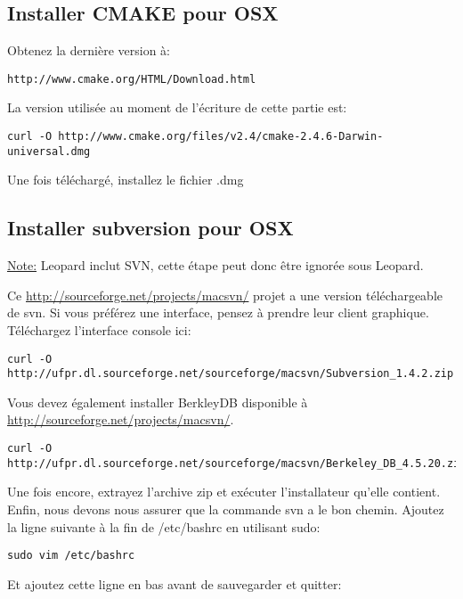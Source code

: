 \subsection{Installer CMAKE pour OSX}
Obtenez la derni\`ere version \`a:

\begin{verbatim}
http://www.cmake.org/HTML/Download.html 
\end{verbatim}

La version utilis\'ee au moment de l'\'ecriture de cette partie est:

\begin{verbatim}
curl -O http://www.cmake.org/files/v2.4/cmake-2.4.6-Darwin-universal.dmg
\end{verbatim}

Une fois t\'el\'echarg\'e, installez le fichier .dmg

\subsection{Installer subversion pour OSX}
\underline{Note:} Leopard inclut SVN, cette \'etape peut donc \^etre ignor\'ee sous Leopard.

Ce \url{http://sourceforge.net/projects/macsvn/} projet a une version t\'el\'echargeable de svn. Si vous pr\'ef\'erez une interface, pensez \`a prendre leur client graphique. T\'el\'echargez l'interface console ici:

\begin{verbatim}
curl -O http://ufpr.dl.sourceforge.net/sourceforge/macsvn/Subversion_1.4.2.zip 
\end{verbatim}

Vous devez \'egalement installer BerkleyDB disponible \`a \url{http://sourceforge.net/projects/macsvn/}. 

\begin{verbatim}
curl -O
http://ufpr.dl.sourceforge.net/sourceforge/macsvn/Berkeley_DB_4.5.20.zip 
\end{verbatim}

Une fois encore, extrayez l'archive zip et ex\'ecuter l'installateur qu'elle contient. Enfin, nous devons nous assurer que la commande svn a le bon chemin. Ajoutez la ligne suivante \`a la fin de /etc/bashrc en utilisant sudo:

\begin{verbatim}
sudo vim /etc/bashrc 
\end{verbatim}

Et ajoutez cette ligne en bas avant de sauvegarder et quitter:

